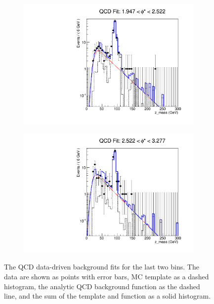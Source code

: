\begin{figure}[!htbp]
    \centering
    \begin{subfigure}[b]{0.5\textwidth}
        \includegraphics[width=\linewidth]{figures/qcd_fits/qcd_fit_plot_for_33.pdf}
        \caption{}
        \label{fig:qcd_fit_33}
    \end{subfigure}%
    \begin{subfigure}[b]{0.5\textwidth}
        \includegraphics[width=\linewidth]{figures/qcd_fits/qcd_fit_plot_for_34.pdf}
        \caption{}
        \label{fig:qcd_fit_34}
    \end{subfigure}
    \caption{
       The QCD data-driven background fits for the last two \phistar bins. The
       data are shown as points with error bars, MC template as a dashed
       histogram, the analytic QCD background function as the dashed line, and
       the sum of the template and function as a solid histogram.
    }
    \label{fig:qcd_many_9}
\end{figure}
